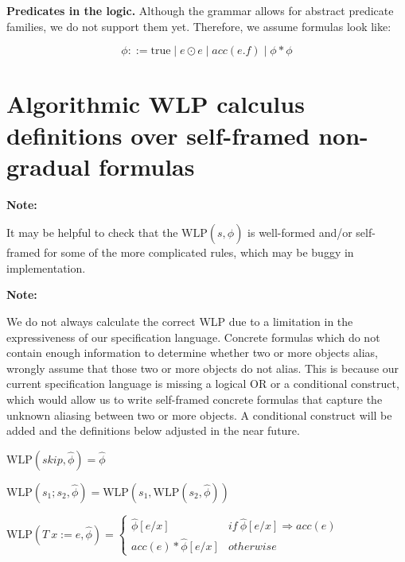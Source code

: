 \documentclass {article}
\newcommand{\true}{\text{true}}
\newcommand{\fphi}{\widehat{\phi}}
\newcommand{\imp}{\Rightarrow}
\newcommand{\wlp}[2]{\text{WLP}(#1,#2)}
\begin{document}
\textbf{Predicates in the logic.} Although the grammar allows for abstract predicate families, we do not support them yet. Therefore, we assume formulas look like:

$$ \phi ::= \true \mid e \odot e \mid acc(e.f) \mid \phi \ast \phi $$

\section{Algorithmic WLP calculus definitions over self-framed non-gradual formulas}
\hspace{0.5cm}

\textbf{Note:} 

It may be helpful to check that the $\wlp{s}{\fphi}$ is well-formed and/or self-framed for some of the more complicated rules, which may be buggy in implementation.

\vspace{0.5cm}

\textbf{Note:}

We do not always calculate the correct WLP due to a limitation in the expressiveness of our specification language. Concrete formulas which do not contain enough information to determine whether two or more objects alias, wrongly assume that those two or more objects do not alias. This is because our current specification language is missing a logical OR or a conditional construct, which would allow us to write self-framed concrete formulas that capture the unknown aliasing between two or more objects. A conditional construct will be added and the definitions below adjusted in the near future.

\vspace{0.5cm}

$\wlp{skip}{\fphi} = \fphi  $

\vspace{0.5cm}

$\wlp{s_1;s_2}{\fphi} = \wlp{s_1}{\wlp{s_2}{\fphi}} $

\vspace{0.5cm}

$\wlp{T \ x := e}{\fphi} = 
	\begin{cases}
	 \fphi[e/x] & if \ \fphi[e/x] \imp acc(e) \\
	 acc(e) \ast \fphi[e/x] & otherwise
	\end{cases} $
\end{document}

